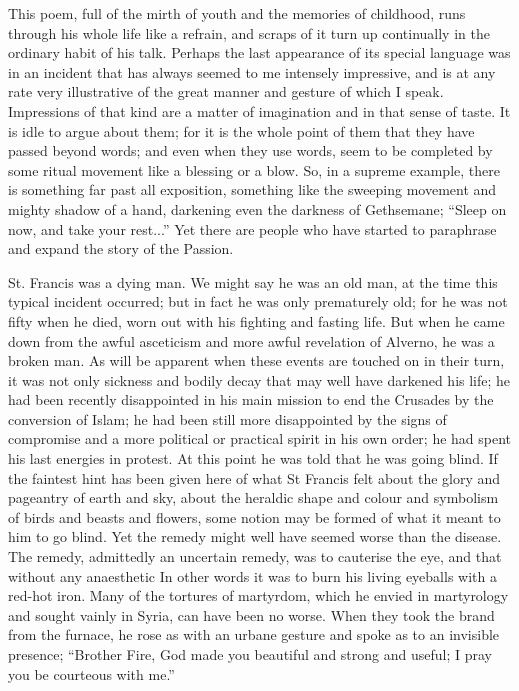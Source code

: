 \documentclass{book}
\begin{document}
This poem, full of the mirth of youth and the memories of childhood, runs through his whole life like a refrain, and scraps of it turn up continually in the ordinary habit of his talk. Perhaps the last appearance of its special language was in an incident that has always seemed to me intensely impressive, and is at any rate very illustrative of the great manner and gesture of which I speak. Impressions of that kind are a matter of imagination and in that sense of taste. It is idle to argue about them; for it is the whole point of them that they have passed beyond words; and even when they use words, seem to be completed by some ritual movement like a blessing or a blow. So, in a supreme example, there is something far past all exposition, something like the sweeping movement and mighty shadow of a hand, darkening even the darkness of Gethsemane; “Sleep on now, and take your rest...” Yet there are people who have started to paraphrase and expand the story of the Passion.

St. Francis was a dying man. We might say he was an old man, at the time this typical incident occurred; but in fact he was only prematurely old; for he was not fifty when he died, worn out with his fighting and fasting life. But when he came down from the awful asceticism and more awful revelation of Alverno, he was a broken man. As will be apparent when these events are touched on in their turn, it was not only sickness and bodily decay that may well have darkened his life; he had been recently disappointed in his main mission to end the Crusades by the conversion of Islam; he had been still more disappointed by the signs of compromise and a more political or practical spirit in his own order; he had spent his last energies in protest. At this point he was told that he was going blind. If the faintest hint has been given here of what St Francis felt about the glory and pageantry of earth and sky, about the heraldic shape and colour and symbolism of birds and beasts and flowers, some notion may be formed of what it meant to him to go blind. Yet the remedy might well have seemed worse than the disease. The remedy, admittedly an uncertain remedy, was to cauterise the eye, and that without any anaesthetic In other words it was to burn his living eyeballs with a red-hot iron. Many of the tortures of martyrdom, which he envied in martyrology and sought vainly in Syria, can have been no worse. When they took the brand from the furnace, he rose as with an urbane gesture and spoke as to an invisible presence; “Brother Fire, God made you beautiful and strong and useful; I pray you be courteous with me.”
\end{document}
